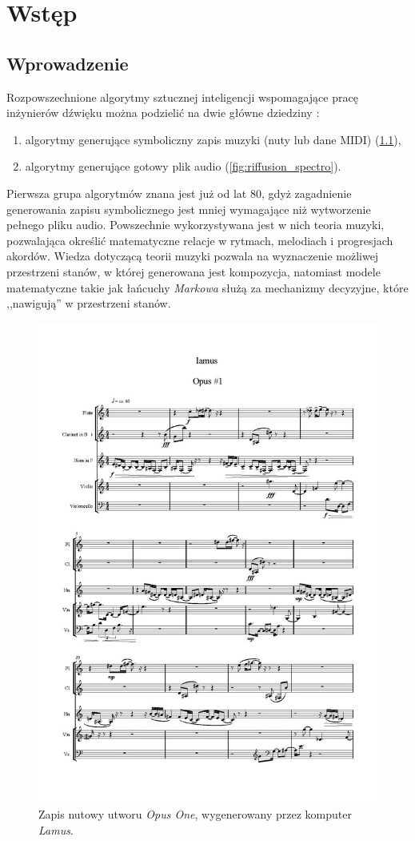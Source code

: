 \chapter{Wstęp}
\section{Wprowadzenie}


Rozpowszechnione algorytmy sztucznej inteligencji wspomagające pracę inżynierów dźwięku można podzielić na dwie główne dziedziny \cite{analysis_generative} \label{traditional_algos}:

\begin{enumerate}
    \item algorytmy generujące symboliczny zapis muzyki (nuty lub dane MIDI) (\ref{fig:lamus_notes}),
    \item algorytmy generujące gotowy plik audio (\ref{fig:riffusion_spectro}).
\end{enumerate}

Pierwsza grupa algorytmów znana jest już od lat 80, gdyż zagadnienie generowania zapisu symbolicznego jest mniej wymagające niż wytworzenie pełnego pliku audio.
Powszechnie wykorzystywana jest w nich teoria muzyki, pozwalająca określić matematyczne relacje w rytmach, melodiach i progresjach akordów.
Wiedza dotyczącą teorii muzyki pozwala na wyznaczenie możliwej przestrzeni stanów, w której generowana jest kompozycja,
natomiast modele matematyczne takie jak łańcuchy \textit{Markowa} służą za mechanizmy decyzyjne, które ,,nawigują'' w przestrzeni stanów.

\begin{figure}[H]
    \centering
    \includegraphics[width=0.4\linewidth]{rys01/lamus_notes.jpg}
    \caption{Zapis nutowy utworu \textit{Opus One}, wygenerowany przez komputer \textit{Lamus}.}
    \label{fig:lamus_notes}
\end{figure}

